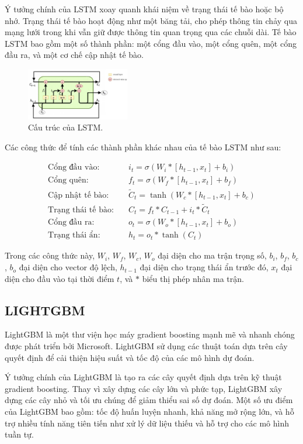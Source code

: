 \documentclass[conference]{IEEEtran}
\begin{document}
Ý tưởng chính của LSTM xoay quanh khái niệm về trạng thái tế bào hoặc bộ nhớ. Trạng thái tế bào hoạt động như một băng tải, cho phép thông tin chảy qua mạng lưới trong khi vẫn giữ được thông tin quan trọng qua các chuỗi dài. Tế bào LSTM bao gồm một số thành phần: một cổng đầu vào, một cổng quên, một cổng đầu ra, và một cơ chế cập nhật tế bào.
\begin{figure}[h]
    \centering
    \includegraphics[width=0.4\textwidth]{bibliography/pictures/lstm.png}
  \caption{Cấu trúc của LSTM.}
\end{figure}
Các công thức để tính các thành phần khác nhau của tế bào LSTM như sau: 


\begin{align*}
\text{Cổng đầu vào:} \quad & i_t = \sigma(W_i * [h_{t-1}, x_t] + b_i) \\
\text{Cổng quên:} \quad & f_t = \sigma(W_f * [h_{t-1}, x_t] + b_f) \\
\text{Cập nhật tế bào:} \quad & \tilde{C}_t = \tanh(W_c * [h_{t-1}, x_t] + b_c) \\
\text{Trạng thái tế bào:} \quad & C_t = f_t * C_{t-1} + i_t * \tilde{C}_t \\
\text{Cổng đầu ra:} \quad & o_t = \sigma(W_o * [h_{t-1}, x_t] + b_o) \\
\text{Trạng thái ẩn:} \quad & h_t = o_t * \tanh(C_t)
\end{align*}

Trong các công thức này, $W_i$, $W_f$, $W_c$, $W_o$ đại diện cho ma trận trọng số, $b_i$, $b_f$, $b_c$, $b_o$ đại diện cho vector độ lệch, $h_{t-1}$ đại diện cho trạng thái ẩn trước đó, $x_t$ đại diện cho đầu vào tại thời điểm $t$, và $*$ biểu thị phép nhân ma trận.

\subsection{LIGHTGBM}
LightGBM là một thư viện học máy gradient boosting mạnh mẽ và nhanh chóng được phát triển bởi Microsoft. LightGBM sử dụng các thuật toán dựa trên cây quyết định để cải thiện hiệu suất và tốc độ của các mô hình dự đoán.

Ý tưởng chính của LightGBM là tạo ra các cây quyết định dựa trên kỹ thuật gradient boosting. Thay vì xây dựng các cây lớn và phức tạp, LightGBM xây dựng các cây nhỏ và tối ưu chúng để giảm thiểu sai số dự đoán. Một số ưu điểm của LightGBM bao gồm: tốc độ huấn luyện nhanh, khả năng mở rộng lớn, và hỗ trợ nhiều tính năng tiên tiến như xử lý dữ liệu thiếu và hỗ trợ cho các mô hình tuần tự.
\end{document}
